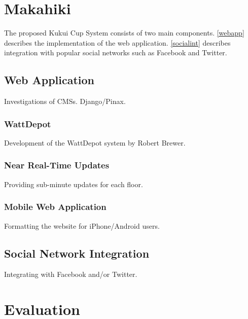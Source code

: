\chapter{Makahiki}
\label{makahiki}

The proposed Kukui Cup System consists of two main components.  \autoref{webapp} describes the implementation of the web application.  \autoref{socialint} describes integration with popular social networks such as Facebook and Twitter.

\section{Web Application}
\label{webapp}

Investigations of CMSs.  Django/Pinax.

\subsection{WattDepot}

Development of the WattDepot system by Robert Brewer.

\subsection{Near Real-Time Updates}

Providing sub-minute updates for each floor.

\subsection{Mobile Web Application}

Formatting the website for iPhone/Android users.

\section{Social Network Integration}
\label{socialint}

Integrating with Facebook and/or Twitter.


\chapter{Evaluation}
\label{evaluation}

